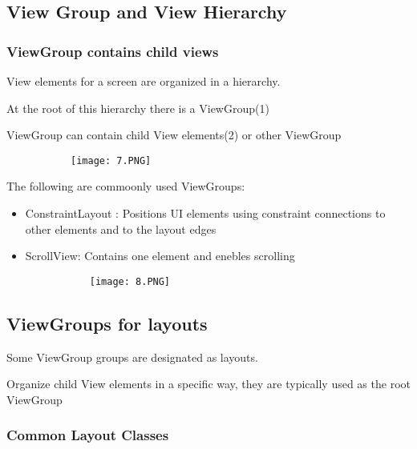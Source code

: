 \documentclass{article}
\begin{document}
\subsection{View Group and View Hierarchy}

\subsubsection{ViewGroup contains child views}

View elements for a screen are organized in a hierarchy.

At the root of this hierarchy there is a ViewGroup(1)

ViewGroup can contain child View elements(2) or other ViewGroup

\begin{figure}[ht!]
  \centering
  \begin{subfigure}[b]{0.6\linewidth}
    \texttt{[image: 7.PNG]}
  \end{subfigure}
\end{figure}

The following are commoonly used ViewGroups:

\begin{itemize}
    \item ConstraintLayout : Positions UI elements using constraint connections to other elements and to the layout edges
    \item ScrollView: Contains one element and enebles scrolling
    \begin{figure}[ht!]
  \centering
  \begin{subfigure}[b]{0.5\linewidth}
    \texttt{[image: 8.PNG]}
  \end{subfigure}
\end{figure}

\end{itemize}

\subsection{ViewGroups for layouts}

Some ViewGroup groups are designated as layouts.

Organize child View elements in a specific way, they are typically used as the root ViewGroup

\subsubsection{Common Layout Classes}
\end{document}
